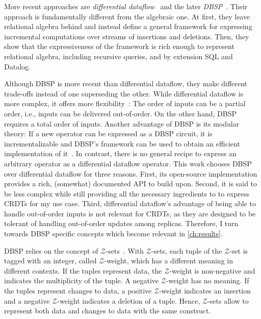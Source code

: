 More recent approaches are \emph{differential dataflow}~\cite{mcsherry2013differential}
and the later \emph{DBSP}~\cite{budiu2022dbsp, budiu2024dbsp, budiu2025dbsp}.
Their approach is fundamentally different from the algebraic one.
At first, they leave relational algebra behind and instead define a general
framework for expressing incremental computations over streams of insertions
and deletions.
Then, they show that the expressiveness of the framework is rich enough to
represent relational algebra, including recursive queries, and by extension
SQL and Datalog.

Although DBSP is more recent than differential dataflow,
they make different trade-offs instead of one superseding the other.
While differential dataflow is more complex, it offers more
flexibility~\cite{budiu2025dbsp}:
The order of inputs can be a partial order, i.e., inputs can be delivered
out-of-order.
On the other hand, DBSP requires a total order of inputs.
Another advantage of DBSP is its modular theory:
If a new operator can be expressed as a DBSP circuit, it is incrementalizable
and DBSP's framework can be used to obtain an efficient implementation
of it~\cite{budiu2025dbsp}.
In contrast, there is no general recipe to express an arbitrary operator
as a differential dataflow operator.
This work chooses DBSP over differential dataflow for three reasons.
First, its open-source implementation~\cite{feldera} provides a rich,
(somewhat) documented API\footnotemark{} to build upon.
Second, it is said to be less complex while still providing all the necessary
ingredients to to express \acp{CRDT} for my use case.
Third, differential dataflow's advantage of being able to handle out-of-order
inputs is not relevant for \acp{CRDT}, as they are designed
to be tolerant of handling out-of-order updates among replicas.
Therefore, I turn towards DBSP specific concepts which become relevant in \ref{ch:results}.


\newcommand{\zset}{\(\mathcal{Z}\)-set}
\newcommand{\zsets}{\(\mathcal{Z}\)-sets}
\newcommand{\zweight}{\(\mathcal{Z}\)-weight}

DBSP relies on the concept of \zsets{}~\cite{green2007provenance}\footnotemark{}.
With \zsets{}, each tuple of the \zset{} is tagged with an integer,
called \zweight{}, which has a different meaning in different contexts.
If the tuples represent data, the \zweight{} is non-negative and indicates
the multiplicity of the tuple.
A negative \zweight{} has no meaning.
If the tuples represent changes to data, a positive \zweight{} indicates
an insertion and a negative \zweight{} indicates a deletion of a tuple.
Hence, \zsets{} allow to represent both data and changes to data with the
same construct.

